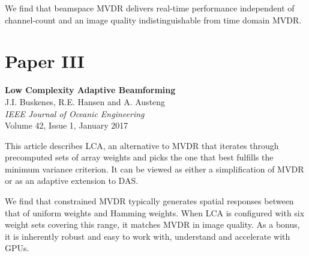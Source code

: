We find that beamspace MVDR delivers real-time performance independent of channel-count and an image quality indistinguishable from time domain MVDR.


%
%


\section{Paper III}\label{sec:paperIII} %
\textbf{Low Complexity Adaptive Beamforming}~\cite{Buskenes2014}\\
J.I. Buskenes, R.E. Hansen and A. Austeng\\
\textit{IEEE Journal of Oceanic Engineering}\\
Volume 42, Issue 1, January 2017

This article describes LCA, an alternative to MVDR that iterates through precomputed sets of array weights and picks the one that best fulfills the minimum variance criterion. It can be viewed as either a simplification of MVDR or as an adaptive extension to DAS.

We find that constrained MVDR typically generates spatial responses between that of uniform weights and Hamming weights. When LCA is configured with six weight sets covering this range, it matches MVDR in image quality. As a bonus, it is inherently robust and easy to work with, understand and accelerate with GPUs.



